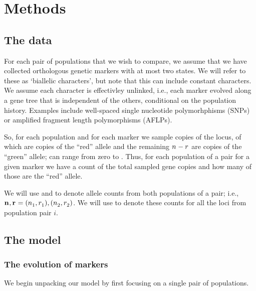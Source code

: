 \section{Methods}

\subsection{The data}
For each pair of populations that we wish to compare, we assume that we have
collected orthologous genetic markers with at most two states.
We will refer to these as `biallelic characters', but note that this can
include constant characters.
We assume each character is effectivley unlinked, i.e., each marker evolved
along a gene tree that is independent of the others, conditional on the
population history.
Examples include well-spaced single nucleotide polymorhphisms (SNPs) or
amplified fragment length polymorphisms (AFLPs).

So, for each population and for each marker we sample \allelecount
copies of the locus, \redallelecount of which are copies of the ``red''
allele and the remaining $\allelecount - \redallelecount$ are
copies of the ``green'' allele;
\redallelecount can range from zero to \allelecount.
Thus, for each population of a pair for a given marker we have a count of the
total sampled gene copies and how many of those are the ``red'' allele.

We will use \leafallelecounts and \leafredallelecounts to denote allele counts
from both populations of a pair; i.e., 
$\leafallelecounts, \leafredallelecounts = (\allelecount[1], \redallelecount[1]), 
(\allelecount[2], \redallelecount[2])$.
We will use \comparisondata[i] to denote these counts for all the loci from
population pair $i$.



\subsection{The model}

\subsubsection{The evolution of markers}

We begin unpacking our model by first focusing on a single pair of populations.


